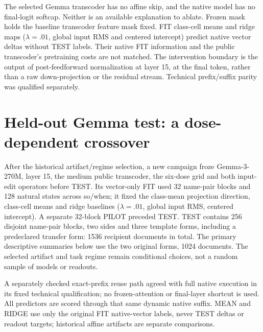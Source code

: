 The selected Gemma transcoder has no affine skip, and the native model has no final-logit softcap. Neither is an available explanation to ablate. Frozen mask holds the baseline transcoder feature mask fixed. FIT class-cell means and ridge maps ($\lambda=.01$, global input RMS and centered intercept) predict native vector deltas without TEST labels. Their native FIT information and the public transcoder's pretraining costs are not matched. The intervention boundary is the output of post-feedforward normalization at layer 15, at the final token, rather than a raw down-projection or the residual stream. Technical prefix/suffix parity was qualified separately.
\section{Held-out Gemma test: a dose-dependent crossover}
\label{sec:newtest}

After the historical artifact/regime selection, a new campaign froze Gemma-3-270M, layer 15, the medium public transcoder, the six-dose grid and both input-edit operators before TEST. Its vector-only FIT used 32 name-pair blocks and 128 natural states across so/when; it fixed the class-mean projection direction, class-cell means and ridge baselines ($\lambda=.01$, global input RMS, centered intercept). A separate 32-block PILOT preceded TEST. TEST contains 256 disjoint name-pair blocks, two sides and three template forms, including a predeclared transfer form: 1536 recipient documents in total. The primary descriptive summaries below use the two original forms, 1024 documents. The selected artifact and task regime remain conditional choices, not a random sample of models or readouts.

A separately checked exact-prefix reuse path agreed with full native execution in its fixed technical qualification; no frozen-attention or final-layer shortcut is used. All predictors are scored through that same dynamic native suffix. MEAN and RIDGE use only the original FIT native-vector labels, never TEST deltas or readout targets; historical affine artifacts are separate comparisons.

